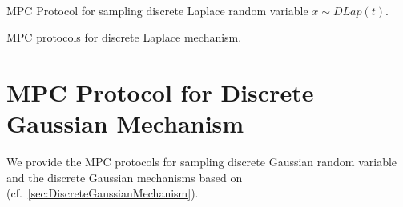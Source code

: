 \begin{protocol}[tbh!]
{{                        \\
                  }}
            \caption{MPC Protocol for sampling discrete Laplace random variable $x \sim DLap\left(t\right) $.}
            \label{prot:DiscreteLap}
      \end{protocol}
      \FloatBarrier

      \begin{protocol}[tbh!]
            \centering
            \caption{MPC protocols for discrete Laplace mechanism.}
            \label{prot:DLapMechanism}
      \end{protocol}
      \FloatBarrier



      \section{MPC Protocol for Discrete Gaussian Mechanism}
      \label{MPCProtocolforDiscreteGaussianMechanism}

      We provide the MPC protocols for sampling discrete Gaussian random variable and the discrete Gaussian mechanisms based on (cf.~\autoref{sec:DiscreteGaussianMechanism}).




